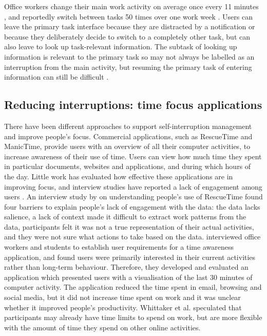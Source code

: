 Office workers change their main work activity on average once every 11 minutes \citep{Mark2005}, and reportedly switch between tasks 50 times over one work week \citep{Czerwinski2004}.  Users can leave the primary task interface because they are distracted by a notification or because they deliberately decide to switch to a completely other task, but can also leave to look up task-relevant information. The subtask of looking up information is relevant to the primary task so may not always be labelled as an interruption from the main activity, but resuming the primary task of entering information can still be difficult \citep{Rule2013}.

\subsection{Reducing interruptions: time focus applications}
There have been different approaches to support self-interruption management and improve people's focus. 
Commercial applications, such as RescueTime and ManicTime, provide users with an overview of all their computer activities, to increase awareness of their use of time. Users can view how much time they spent in particular documents, websites and applications, and during which hours of the day. Little work has evaluated how effective these applications are in improving focus, and interview studies have reported a lack of engagement among users \citep{Collins2014, Whittaker2016}. An interview study by \citet{Collins2014} on understanding people’s use of RescueTime found four barriers to explain people’s lack of engagement with the data: the data lacks salience, a lack of context made it difficult to extract work patterns from the data, participants felt it was not a true representation of their actual activities, and they were not sure what actions to take based on the data. 
\citet{Whittaker2016} interviewed office workers and students to establish user requirements for a time awareness application, and found users were primarily interested in their current activities rather than long-term behaviour. Therefore, they developed and evaluated an application which presented users with a visualisation of the last 30 minutes of computer activity. The application reduced the time spent in email, browsing and social media, but it did not increase time spent on work and it was unclear whether it improved people’s productivity. Whittaker et al. speculated that participants may already have time limits to spend on work, but are more flexible with the amount of time they spend on other online activities.
